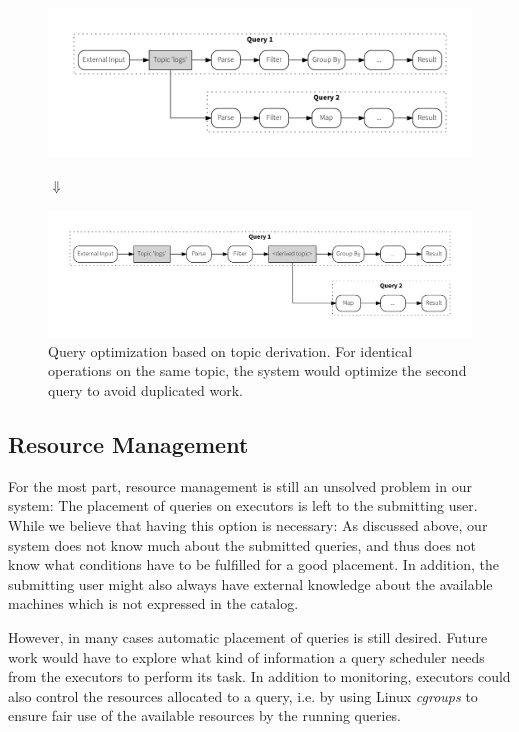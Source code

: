 \begin{figure}[!htb]
  \includegraphics[scale=0.36]{figures/composition/q1q2_man}
  \vspace{-1.5em}
  \begin{center}
  $\Downarrow$
  \end{center}
  \vspace{-1.2em}
  \includegraphics[scale=0.36]{figures/composition/q1q2_auto}
  \caption{Query optimization based on topic derivation. For identical
  operations on the same topic, the system would optimize the second
  query to avoid duplicated work.}
  \label{fig:queryoptimization}
\end{figure}

\subsection{Resource Management}

For the most part, resource management is still an unsolved problem in our
system: The placement of queries on executors is left to the submitting user.
While we believe that having this option is necessary: As discussed above, 
our system does not know much about the submitted queries, and thus does not
know what conditions have to be fulfilled for a good placement. In addition,
the submitting user might also always have external knowledge about the
available machines which is not expressed in the catalog.

However, in many cases automatic placement of queries is still desired. Future
work would have to explore what kind of information a query scheduler needs
from the executors to perform its task. In addition to monitoring, executors
could also control the resources allocated to a query, i.e. by using Linux
\emph{cgroups} \cite{cgroups} to ensure fair use of the available resources
by the running queries.

